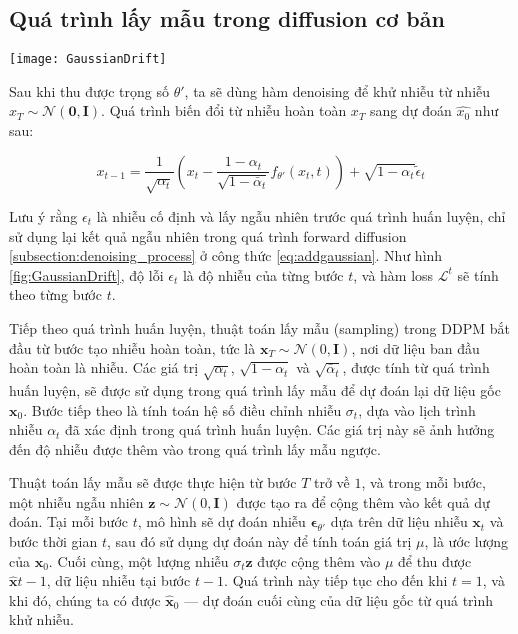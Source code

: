 	
\subsection{Quá trình lấy mẫu trong diffusion cơ bản}
	
		\begin{figure*}
		\centering
		\texttt{[image: GaussianDrift]}
		\caption{Quá trình Training và Sampling trong mô hình Diffusion tiêu chuẩn}
		\label{fig:GaussianDrift}
	\end{figure*}
	

	Sau khi thu được trọng số $\theta'$, ta sẽ dùng hàm denoising để khử nhiễu từ nhiễu $x_T \sim \mathcal{N} (\mathbf{0}, \mathbf{I})$.
	Quá trình biến đổi từ nhiễu hoàn toàn $x_{T}$ sang dự đoán $\hat{x_0}$ như sau:
	
	\begin{equation}
		\label{eq:adddenoising}
		x_{t-1} = \frac{1}{\sqrt{\alpha_t}} \left( x_t - \frac{1- \alpha_t}{\sqrt{1 - \bar{\alpha}_t}} f_{\theta'}(x_t, t) \right) + \sqrt{1 - \alpha_t} \tilde{\epsilon}_t
	\end{equation}
	
Lưu ý rằng $\epsilon_t$ là nhiễu cố định và lấy ngẫu nhiên trước quá trình huấn luyện, chỉ sử dụng lại kết quả ngẫu nhiên trong quá trình forward diffusion \ref{subsection:denoising_process} ở công thức  \ref{eq:addgaussian}. Như hình \ref{fig:GaussianDrift}, độ lỗi $\epsilon_t$ là độ nhiễu của từng bước $t$, và hàm loss  $\mathcal{L}^{t}$ sẽ tính theo từng bước $t$.


Tiếp theo quá trình huấn luyện, thuật toán lấy mẫu (sampling) trong DDPM bắt đầu từ bước tạo nhiễu hoàn toàn, tức là $\mathbf{x}_T \sim \mathcal{N}(0, \mathbf{I})$, nơi dữ liệu ban đầu hoàn toàn là nhiễu. Các giá trị $\sqrt{\alpha_t}$, $\sqrt{1 - \alpha_t}$ và $\sqrt{\bar{\alpha}_t}$, được tính từ quá trình huấn luyện, sẽ được sử dụng trong quá trình lấy mẫu để dự đoán lại dữ liệu gốc $\mathbf{x}_0$. Bước tiếp theo là tính toán hệ số điều chỉnh nhiễu $\sigma_t$, dựa vào lịch trình nhiễu $\alpha_t$ đã xác định trong quá trình huấn luyện. Các giá trị này sẽ ảnh hưởng đến độ nhiễu được thêm vào trong quá trình lấy mẫu ngược.

Thuật toán lấy mẫu sẽ được thực hiện từ bước $T$ trở về $1$, và trong mỗi bước, một nhiễu ngẫu nhiên $\mathbf{z} \sim \mathcal{N}(0, \mathbf{I})$ được tạo ra để cộng thêm vào kết quả dự đoán. Tại mỗi bước $t$, mô hình sẽ dự đoán nhiễu $\boldsymbol{\epsilon}_{\theta'}$ dựa trên dữ liệu nhiễu $\mathbf{x}_t$ và bước thời gian $t$, sau đó sử dụng dự đoán này để tính toán giá trị $\mu$, là ước lượng của $\mathbf{x}_0$. Cuối cùng, một lượng nhiễu $\sigma_t \mathbf{z}$ được cộng thêm vào $\mu$ để thu được $\hat{\mathbf{x}}{t-1}$, dữ liệu nhiễu tại bước $t-1$. Quá trình này tiếp tục cho đến khi $t = 1$, và khi đó, chúng ta có được $\hat{\mathbf{x}}_0$ — dự đoán cuối cùng của dữ liệu gốc từ quá trình khử nhiễu.

